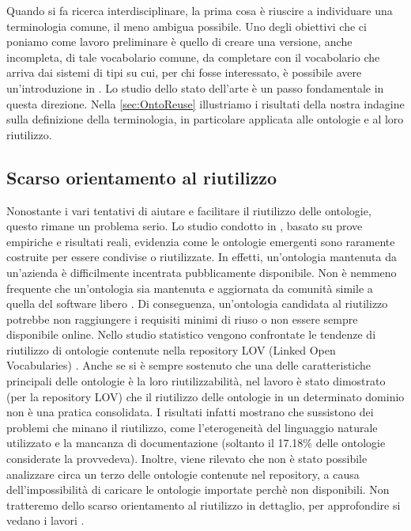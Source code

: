 Quando si fa ricerca interdisciplinare, la prima cosa è riuscire a individuare una terminologia comune, il meno ambigua possibile. Uno degli obiettivi che ci poniamo come lavoro preliminare è quello di creare una versione, anche incompleta, di tale vocabolario comune, da completare con il vocabolario che arriva dai sistemi di tipi su cui, per chi fosse interessato, è possibile avere un'introduzione in \cite{pierceTypesBook}. Lo studio dello stato dell'arte è un passo fondamentale in questa direzione. Nella \autoref{sec:OntoReuse} illustriamo i risultati della nostra indagine sulla definizione della terminologia, in particolare applicata alle ontologie e al loro riutilizzo.
\subsection{Scarso orientamento al riutilizzo}
Nonostante i vari tentativi di aiutare e facilitare il riutilizzo delle ontologie, questo rimane un problema serio. Lo studio condotto in \cite{feasibilityStudy}, basato su prove empiriche e risultati reali, evidenzia come le ontologie emergenti sono raramente costruite per essere condivise o riutilizzate. In effetti, un'ontologia mantenuta da un'azienda è difficilmente incentrata pubblicamente disponibile. Non è nemmeno frequente che un'ontologia sia mantenuta e aggiornata da comunità simile a quella del software libero \cite{whyareontologiesnotreused}. Di conseguenza, un'ontologia candidata al riutilizzo potrebbe non raggiungere i requisiti minimi di riuso o non essere sempre disponibile online.
Nello studio statistico \cite{whyareontologiesnotreused} vengono confrontate le tendenze di riutilizzo di ontologie contenute nella repository LOV (Linked Open Vocabularies) \cite{vandenbussche2017linked}. Anche se si è sempre sostenuto che una delle caratteristiche principali delle ontologie è la loro riutilizzabilità, nel lavoro \cite{whyareontologiesnotreused} è stato dimostrato (per la repository LOV) che il riutilizzo delle ontologie in un determinato dominio non è una pratica consolidata. I risultati infatti mostrano che sussistono dei problemi che minano il riutilizzo, come l'eterogeneità del linguaggio naturale utilizzato e la mancanza di documentazione (soltanto il 17.18\% delle ontologie considerate la provvedeva). Inoltre, viene rilevato che non è stato possibile analizzare circa un terzo delle ontologie contenute nel repository, a causa dell'impossibilità di caricare le ontologie importate perchè non disponibili. 
Non tratteremo dello scarso orientamento al riutilizzo in dettaglio, per approfondire si vedano i lavori \cite{ontology2014summit, feasibilityStudy, whyareontologiesnotreused}.


